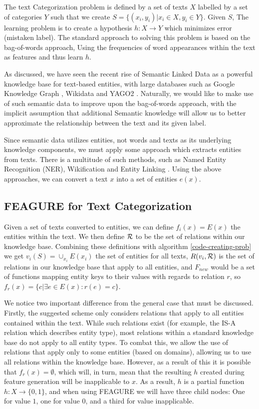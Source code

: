 \documentclass[twoside,11pt]{article}
\theoremstyle{definition}
\begin{document}
The text Categorization problem is defined by a set of texts $X$ labelled by a set of categories $Y$ such that we create $S=\{(x_i,y_i)|x_i\in X, y_i\in Y\}$. Given $S$, The learning problem is to create a hypothesis $h:X\rightarrow Y$ which minimizes error (mistaken label).
The standard approach to solving this problem is based on the bag-of-words \cite{Wu:1981:CST:1013228.511759,salton1983introduction} approach, Using the frequencies of word appearances within the text as features and thus learn $h$.

As discussed, we have seen the recent rise of Semantic Linked Data as a powerful knowledge base for text-based entities, with large databases such as Google Knowledge Graph \cite{pelikanova2014google}, Wikidata \cite{vrandevcic2014wikidata} and YAGO2 \cite{hoffart2013yago2}. Naturally, we would like to make use of such semantic data to improve upon the bag-of-words approach, with the implicit assumption that additional Semantic knowledge will allow us to better approximate the relationship between the text and its given label.

Since semantic data utilizes entities, not words and texts as its underlying knowledge components, we must apply some approach which extracts entities from texts. There is a multitude of such methods, such as Named Entity Recognition (NER),  Wikification \cite{bunescu2006using} and Entity Linking \cite{rao2013entity}.
Using the above approaches, we can convert a text $x$ into a set of entities $e(x)$.

\subsection{FEAGURE for Text Categorization}

Given a set of texts converted to entities, we can define $f_i(x)=E(x)$ the entities within the text. We then define ${\cal R}$ to be the set of relations within our knowledge base. Combining these definitions with algorithm \ref{code-creating-prob} we get $v_i(S)=\cup_{x_i}{E(x_i)}$ the set of entities for all texts, $R(v_i,{\cal R})$ is the set of relations in our knowledge base that apply to all entities, and $F_{new}$ would be a set of functions mapping entity keys to their values with regards to relation $r$, so $f_r(x)=\{c|\exists e\in E(x):r(e)=c\}$.

We notice two important difference from the general case that must be discussed.
Firstly, the suggested scheme only considers relations that apply to all entities contained within the text. While such relations exist (for example, the IS-A relation which describes entity type), most relations within a standard knowledge base do not apply to all entity types. To combat this, we allow the use of relations that apply only to some entities (based on domains), allowing us to use all relations within the knowledge base. However, as a result of this it is possible that $f_r(x)=\emptyset$, which will, in turn, mean that the resulting $h$ created during feature generation will be inapplicable to $x$. As a result, $h$ is a partial function $h:X\rightarrow \{0,1\}$, and when using FEAGURE we will have three child nodes: One for value $1$, one for value $0$, and a third for value inapplicable.
\end{document}
